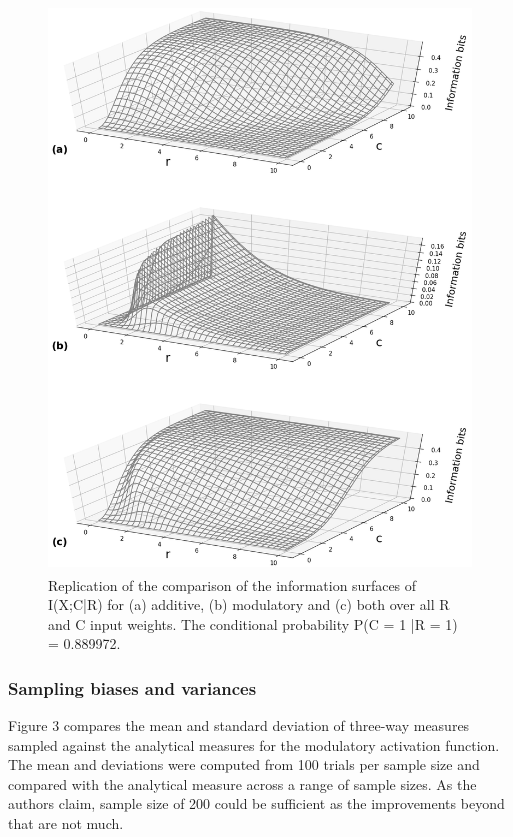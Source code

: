 \begin{figure}[H]
    \begin{center}
        \includegraphics[width=12cm,height=15cm]{figure_2.png}
    \end{center}
      \caption{Replication of the comparison of the information surfaces of I(X;C|R) for (a) additive, (b) modulatory and (c) both over all R and C input weights. The conditional probability P(C = 1 |R = 1) = 0.889972.}
\end{figure}

\subsubsection{Sampling biases and variances}

Figure 3 compares the mean and standard deviation of three-way measures sampled against the analytical measures for the modulatory activation function. The mean and deviations were computed from 100 trials per sample size and compared with the analytical measure across a range of sample sizes. As the authors claim, sample size of 200 could be sufficient as the improvements beyond that are not much.


